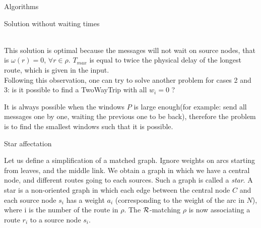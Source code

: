 \documentclass[a4paper,10pt]{report}
\begin{document}
\begin{chapter}{Algorithms}
\begin{section}{Solution without waiting times}
{{{
 }}}\\

This solution is optimal because the messages will not wait on source nodes, that is $\omega(r) = 0$, $\forall r \in \rho$. $T_{max}$ is
equal to twice the physical delay of the longest route, which is given in the input.\\


Following this observation, one can try to solve another problem for cases 2 and 3: is it possible to find a TwoWayTrip
with all $w_i = 0$ ? 

It is always possible when the windows $P$ is large enough(for example: send all messages one by one, waiting the previous one to be back),
therefore the problem is to find the smallest windows such that it is possible.

\begin{subsection}{Star affectation}
 
Let us define a simplification of a matched graph. Ignore weights on arcs starting from leaves, and the middle link.
We obtain a graph in which we have a central node, and different routes going to each sources.
Such a graph is called a \emph{star}. A star is a non-oriented graph in which each edge between the central node $C$ and each source node $s_i$
has a weight $a_i$ (corresponding to the weight of the arc in $N$), where i is the number of the route in $\rho$. The ${\cal R}$-matching $\rho$ is now
associating a route $r_i$ to a source node $s_i$.\\

\end{subsection}
\end{section}
\end{chapter}
\end{document}
